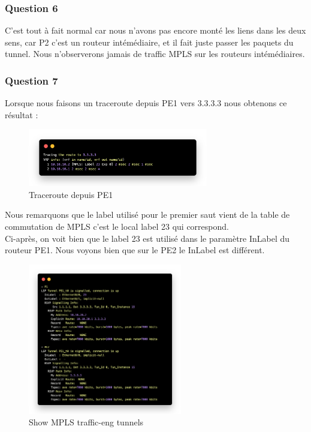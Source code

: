 \documentclass[12pt, a4paper]{article}
\begin{document}
\subsubsection{Question 6}
C'est tout à fait normal car nous n'avons pas encore monté les liens dans les
deux sens, car P2 c'est un routeur intémédiaire, et il fait juste passer les 
paquets du tunnel. Nous n'observerons jamais de traffic MPLS sur les 
routeurs intémédiaires. 

\newpage
\subsubsection{Question 7}
Lorsque nous faisons un traceroute depuis PE1 vers 3.3.3.3 nous obtenons 
ce résultat : 
\begin{figure}[h]
    \centering
    \includegraphics[width=0.7\textwidth]{img/code8.png}
    \caption{Traceroute depuis PE1}
    \label{fig:script8}
\end{figure}

Nous remarquons que le label utilisé pour le premier saut vient de la table
de commutation de MPLS c'est le local label 23 qui correspond.\\

Ci-après, on voit bien que le label 23 est utilisé dans le paramètre InLabel du 
routeur PE1. Nous voyons bien que sur le PE2 le InLabel est différent. 
\begin{figure}[h]
    \centering
    \includegraphics[width=0.6\textwidth]{img/code9.png}
    \caption{Show MPLS traffic-eng tunnels}
    \label{fig:script9}
\end{figure}
\end{document}
